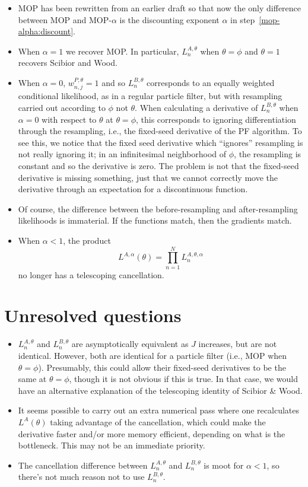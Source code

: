 \documentclass[12p]{article}
\begin{document}
\begin{itemize}
\item MOP has been rewritten from an earlier draft so that now the only difference between MOP and MOP-$\alpha$ is the discounting exponent $\alpha$ in step~\ref{mop-alpha:discount}.
\item When $\alpha=1$ we recover MOP. In particular, $L^{A,\theta}_n$ when $\theta=\phi$ and $\theta=1$ recovers Scibior and Wood. 
\item When $\alpha=0$, $w^{P,\theta}_{n,j}=1$ and so $L^{B,\theta}_n$ corresponds to an equally weighted conditional likelihood, as in a regular particle filter, but with resampling carried out according to $\phi$ not $\theta$.
  When calculating a derivative of $L_n^{B, \theta}$ when $\alpha=0$ with respect to $\theta$ at $\theta=\phi$, this corresponds to ignoring differentiation through the resampling, i.e., the fixed-seed derivative of the PF algorithm.
  To see this, we notice that the fixed seed derivative which ``ignores'' resampling is not really ignoring it; in an infinitesimal neighborhood of $\phi$, the resampling is constant and so the derivative is zero.
  The problem is not that the fixed-seed derivative is missing something, just that we cannot correctly move the derivative through an expectation for a discontinuous function.
\item Of course, the difference between the before-resampling and after-resampling likelihoods is immaterial. If the functions match, then the gradients match. 
\item When $\alpha < 1$, the product
\[
  L^{A,\alpha}(\theta)=\prod_{n=1}^N L^{A,\theta,\alpha}_n
\]
no longer has a telescoping cancellation. 
\end{itemize}

\section{Unresolved questions}

\begin{itemize}
\item $L^{A,\theta}_n$ and $L^{B,\theta}_n$ are asymptotically equivalent as $J$ increases, but are not identical.
  However, both are identical for a particle filter (i.e., MOP when $\theta=\phi$).
  Presumably, this could allow their fixed-seed derivatives to be the same at $\theta=\phi$, though it is not obvious if this is true.
  In that case, we would have an alternative explanation of the telescoping identity of Scibior \& Wood.
 
\item It seems possible to carry out an extra numerical pass where one recalculates $L^A(\theta)$ taking advantage of the cancellation, which could make the derivative faster and/or more memory efficient, depending on what is the bottleneck. This may not be an immediate priority.

  \item The cancellation difference between  $L^{A,\theta}_n$ and $L^{B,\theta}_n$ is moot for $\alpha<1$, so there's not much reason not to use $L^{B,\theta}_n$.
 
\end{itemize}
\end{document}
